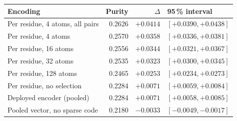 \begin{tabular}{lrrl}
\toprule
    \textbf{Encoding} & \textbf{Purity} & \textbf{$\Delta$} & \textbf{95\,\% interval} \\
\midrule
    Per residue, 4 atoms, all pairs & 0.2626 & $+0.0414$ & $[+0.0390, +0.0438]$ \\
    Per residue, 4 atoms & 0.2570 & $+0.0358$ & $[+0.0336, +0.0381]$ \\
    Per residue, 16 atoms & 0.2556 & $+0.0344$ & $[+0.0321, +0.0367]$ \\
    Per residue, 32 atoms & 0.2535 & $+0.0323$ & $[+0.0300, +0.0345]$ \\
    Per residue, 128 atoms & 0.2465 & $+0.0253$ & $[+0.0234, +0.0273]$ \\
    Per residue, no selection & 0.2284 & $+0.0071$ & $[+0.0059, +0.0084]$ \\
    Deployed encoder (pooled) & 0.2284 & $+0.0071$ & $[+0.0058, +0.0085]$ \\
    Pooled vector, no sparse code & 0.2180 & $-0.0033$ & $[-0.0049, -0.0017]$ \\
\bottomrule
\end{tabular}
